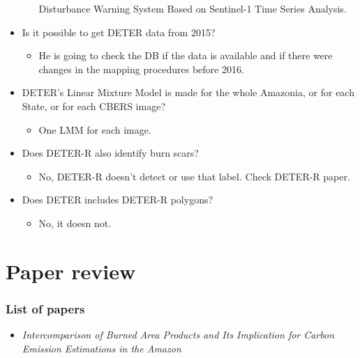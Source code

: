 \documentclass{beamer}
\begin{document}
\begin{frame}[t, allowframebreaks]
\begin{itemize}
\begin{itemize}
                Disturbance Warning System Based on Sentinel-1 Time Series 
                Analysis.
        \end{itemize}
        \item Is it possible to get DETER data from 2015? 
        \begin{itemize}
            \item He is going to check the DB if the data is available and if
                there were changes in the mapping procedures before 2016.
        \end{itemize}
        \item DETER's Linear Mixture Model is made for the whole Amazonia, or
            for each State, or for each CBERS image?
        \begin{itemize}
            \item One LMM for each image.
        \end{itemize}
        \item Does DETER-R also identify burn scars? 
        \begin{itemize}
            \item No, DETER-R doesn't detect or use that label. Check DETER-R 
                paper.
        \end{itemize}
        \item Does DETER includes DETER-R polygons?
        \begin{itemize}
            \item No, it doesn not.
        \end{itemize}
    \end{itemize}
\end{frame}



\section{Paper review}

\begin{frame}
    \frametitle{List of papers}
    \begin{itemize}
        \item \textit{Intercomparison of Burned Area Products and Its 
            Implication for Carbon Emission Estimations in the Amazon}
    \end{itemize}
\end{frame}
\end{document}
